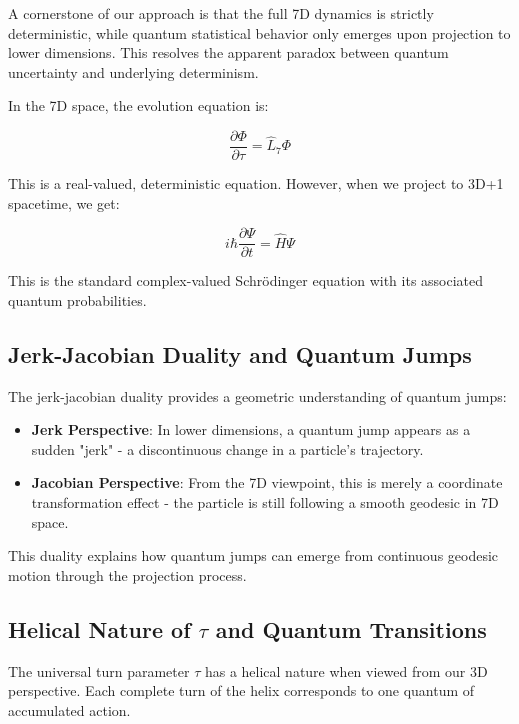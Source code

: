 \documentclass{article}
\begin{document}
A cornerstone of our approach is that the full 7D dynamics is strictly deterministic, while quantum statistical behavior only emerges upon projection to lower dimensions. This resolves the apparent paradox between quantum uncertainty and underlying determinism.

In the 7D space, the evolution equation is:

\begin{equation}
\frac{\partial \Phi}{\partial \tau} = \hat{L}_7 \Phi
\end{equation}

This is a real-valued, deterministic equation. However, when we project to 3D+1 spacetime, we get:

\begin{equation}
i\hbar \frac{\partial \Psi}{\partial t} = \hat{H} \Psi
\end{equation}

This is the standard complex-valued Schrödinger equation with its associated quantum probabilities.

\subsection{Jerk-Jacobian Duality and Quantum Jumps}

The jerk-jacobian duality provides a geometric understanding of quantum jumps:

\begin{itemize}
\item \textbf{Jerk Perspective}: In lower dimensions, a quantum jump appears as a sudden "jerk" - a discontinuous change in a particle's trajectory.
\item \textbf{Jacobian Perspective}: From the 7D viewpoint, this is merely a coordinate transformation effect - the particle is still following a smooth geodesic in 7D space.
\end{itemize}

This duality explains how quantum jumps can emerge from continuous geodesic motion through the projection process.

\subsection{Helical Nature of $\tau$ and Quantum Transitions}

The universal turn parameter $\tau$ has a helical nature when viewed from our 3D perspective. Each complete turn of the helix corresponds to one quantum of accumulated action.
\end{document}
